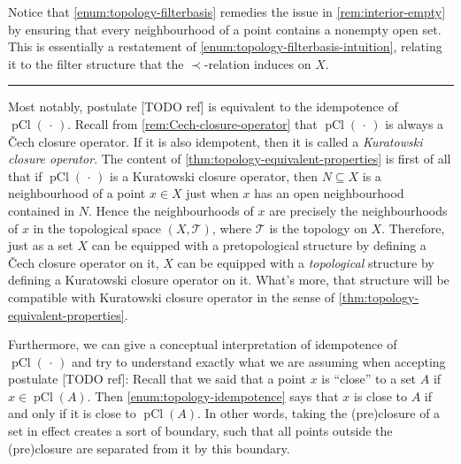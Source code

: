 \documentclass[article, a4paper, 11pt, oneside]{memoir}
\numberwithin{equation}{chapter}
\newcommand{\calT}{\mathcal{T}}
\newcommand{\inpoint}{\prec}
\newcommand{\pCl}[1]{\operatorname{pCl}(#1)}
\newcommand\fleuronbreak{\fancybreak{\textcolor{linkcolor}{\adfhangingflatleafleft}}}
\begin{document}
Notice that \cref{enum:topology-filterbasis} remedies the issue in \cref{rem:interior-empty} by ensuring that every neighbourhood of a point contains a nonempty open set. This is essentially a restatement of \cref{enum:topology-filterbasis-intuition}, relating it to the filter structure that the $\inpoint$-relation induces on $X$.

\fleuronbreak

Most notably, postulate [TODO ref] is equivalent to the idempotence of $\pCl{\,\cdot\,}$. Recall from \cref{rem:Cech-closure-operator} that $\pCl{\,\cdot\,}$ is always a \v{C}ech closure operator. If it is also idempotent, then it is called a \emph{Kuratowski closure operator}. The content of \cref{thm:topology-equivalent-properties} is first of all that if $\pCl{\,\cdot\,}$ is a Kuratowski closure operator, then $N \subseteq X$ is a neighbourhood of a point $x \in X$ just when $x$ has an open neighbourhood contained in $N$. Hence the neighbourhoods of $x$ are precisely the neighbourhoods of $x$ in the topological space $(X,\calT)$, where $\calT$ is the topology on $X$. Therefore, just as a set $X$ can be equipped with a pretopological structure by defining a \v{C}ech closure operator on it, $X$ can be equipped with a \emph{topological} structure by defining a Kuratowski closure operator on it. What's more, that structure will be compatible with Kuratowski closure operator in the sense of \cref{thm:topology-equivalent-properties}.

Furthermore, we can give a conceptual interpretation of idempotence of $\pCl{\,\cdot\,}$ and try to understand exactly what we are assuming when accepting postulate [TODO ref]: Recall that we said that a point $x$ is \enquote{close} to a set $A$ if $x \in \pCl{A}$. Then \cref{enum:topology-idempotence} says that $x$ is close to $A$ if and only if it is close to $\pCl{A}$. In other words, taking the (pre)closure of a set in effect creates a sort of boundary, such that all points outside the (pre)closure are separated from it by this boundary.


\nocite{*}

\printbibliography
\end{document}
